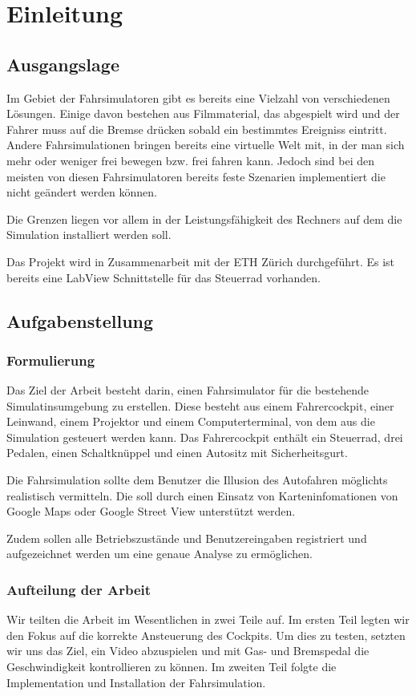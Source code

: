 \section{Einleitung}
\subsection{Ausgangslage}

Im Gebiet der Fahrsimulatoren gibt es bereits eine Vielzahl von verschiedenen Lösungen. Einige davon bestehen aus Filmmaterial, das abgespielt wird und der Fahrer muss auf die Bremse drücken sobald ein bestimmtes Ereigniss eintritt. Andere Fahrsimulationen bringen bereits eine virtuelle Welt mit, in der man sich mehr oder weniger frei bewegen bzw. frei fahren kann. Jedoch sind bei den meisten von diesen Fahrsimulatoren bereits feste Szenarien implementiert die  nicht geändert werden können.

Die Grenzen liegen vor allem in der Leistungsfähigkeit des Rechners auf dem die Simulation installiert werden soll.

Das Projekt wird in Zusammenarbeit mit der ETH Zürich durchgeführt. Es ist bereits eine LabView Schnittstelle für das Steuerrad vorhanden.


\subsection{Aufgabenstellung}
\subsubsection{Formulierung}

Das Ziel der Arbeit besteht darin, einen Fahrsimulator für die bestehende Simulatinsumgebung zu erstellen. Diese besteht aus einem Fahrercockpit, einer Leinwand, einem Projektor und einem Computerterminal, von dem aus die Simulation gesteuert werden kann. Das Fahrercockpit enthält ein Steuerrad, drei Pedalen, einen Schaltknüppel und einen Autositz mit Sicherheitsgurt.

Die Fahrsimulation sollte dem Benutzer die Illusion des Autofahren möglichts realistisch vermitteln. Die soll durch einen Einsatz von Karteninfomationen von Google Maps oder Google Street View unterstützt werden. 

Zudem sollen alle Betriebszustände und Benutzereingaben registriert und aufgezeichnet werden um eine genaue Analyse zu ermöglichen. 


\subsubsection{Aufteilung der Arbeit}
Wir teilten die Arbeit im Wesentlichen in zwei Teile auf. Im ersten Teil legten wir den Fokus auf die korrekte Ansteuerung des Cockpits. Um dies zu testen, setzten wir uns das Ziel, ein Video abzuspielen und mit Gas- und Bremspedal die Geschwindigkeit kontrollieren zu können. Im zweiten Teil folgte die Implementation und Installation der Fahrsimulation.
